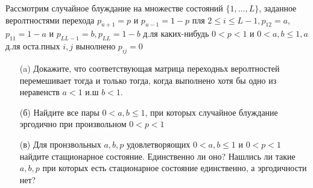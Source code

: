  
    \begin{prob}
        Рассмотрим случайное блуждание на множестве состояний $\{1, \ldots, L\}$, заданное веролтностями перехода $p_{u+1}=p$ и $p_{u-1}=1-p$ пля $2 \leq i \leq L-1, p_{12}=a$, $p_{11}=1-a$ и $p_{L L-1}=b, p_{L L}=1-b$ д.ля каких-нибудь $0<p<1$ и $0<a, b \leq 1, a$ д.ля оста.пных $i, j$ вынолнено $p_{i j}=0$
        \begin{itemize}
        \item [(a)]
            Докажите, что соответствующая матрица переходньх веролтностей перемешивает тогда и только тогда, когда выполнено хотя бы одно из неравенств $a<1$ и.ш $b<1$.
        \item [(б)]
            Найдите все пары $0<a, b \leq 1$, при которых случайное блуждание эргодично при произвольном $0<p<1$
        \item [(в)]
            Для пронзвольных $a, b, p$ удовлетворяощих $0<a, b \leq 1$ и $0<p<1$ найдите стащионарное состояние. Единственно ли оно? Нашлись ли такие $a, b, p$ при которых есть стационарное состояние единственно, а эргодичности нет?
        \end{itemize}
    \end{prob}
